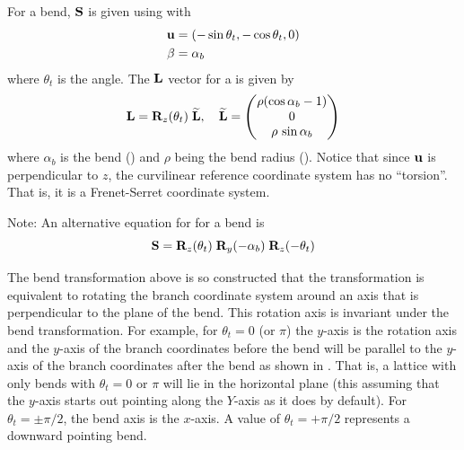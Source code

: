 For a bend, ${\bf S}$ is given using  with 
\begin{align}
  {\bf u} &= (-\sin\theta_t, -\cos\theta_t, 0) \nonumber \\
  \beta &= \alpha_b
  \label{ustt}
\end{align}
where $\theta_t$ is the  angle. The ${\bf L}$ vector for a  is given by 
\begin{equation}
  {\bf L} = {\bf R}_{z}(\theta_t) \; {\widetilde{\bf L}}, \quad
  {\widetilde{\bf L}} = 
  \begin{pmatrix}
    \rho (\cos\alpha_b - 1) \\ 0 \\ \rho \, \sin\alpha_b
  \end{pmatrix}
  \label{lrztt}
\end{equation}
where $\alpha_b$ is the bend  () and $\rho$ being the bend radius
(). Notice that since ${\bf u}$ is perpendicular to $z$, the curvilinear reference coordinate
system has no ``torsion''. That is, it is a Frenet-Serret coordinate system.

Note: An alternative equation for \vn{\bfS} for a bend is
 \begin{equation}
  {\bf S} = {\bf R}_{z}(\theta_t) \; {\bf R}_{y}(-\alpha_b) \; {\bf R}_{z}(-\theta_t)
  \label{srrr}
\end{equation}

The bend transformation above is so constructed that the transformation is equivalent to rotating
the branch coordinate system around an axis that is perpendicular to the plane of the bend. This
rotation axis is invariant under the bend transformation. For example, for $\theta_t = 0$ (or $\pi$)
the $y$-axis is the rotation axis and the $y$-axis of the branch coordinates before the bend will be
parallel to the $y$-axis of the branch coordinates after the bend as shown in . That
is, a lattice with only bends with $\theta_t = 0$ or $\pi$ will lie in the horizontal plane (this
assuming that the $y$-axis starts out pointing along the $Y$-axis as it does by default).  For
$\theta_t = \pm\pi/2$, the bend axis is the $x$-axis. A value of $\theta_t = +\pi/2$ represents a
downward pointing bend.

